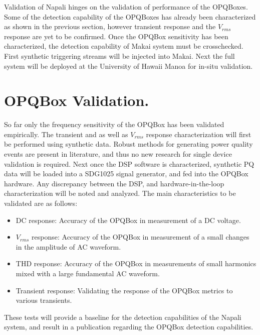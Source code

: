 Validation of Napali hinges on the validation of performance of the OPQBoxes. Some of the detection capability of the OPQBoxes has already been characterized as shown in the previous section, however transient response and the $V_{rms}$ response are yet to be confirmed. Once the OPQBox sensitivity has been characterized, the detection capability of Makai system must be crosschecked. First synthetic triggering streams will be injected into Makai. Next the full system will be deployed at the University of Hawaii Manoa for in-situ validation.

\section{OPQBox Validation.}
So far only the frequency sensitivity of the OPQBox has been validated empirically. The transient and as well as $V_{rms}$ response characterization will first be performed using synthetic data. Robust methods for generating power quality events are present in literature, and thus no new research for single device validation is required.\cite{kumar2015power}\cite{tan2013simulation} Next once the DSP software is characterized, synthetic PQ data will be loaded into a SDG1025 signal generator, and fed into the OPQBox hardware. Any discrepancy between the DSP, and hardware-in-the-loop characterization will be noted and analyzed. The main characteristics to be validated are as follows:
\begin{itemize}
  \item{DC response:} Accuracy of the OPQBox in measurement of a DC voltage.
  \item{$V_{rms}$ response:} Accuracy of the OPQBox in measurement of a small changes in the amplitude of AC waveform.
  \item{THD response:} Accuracy of the OPQBox in measurements of small harmonics mixed with a large fundamental AC waveform.
  \item{Transient response:} Validating the response of the OPQBox metrics to various transients.
\end{itemize} 
These tests will provide a baseline for the detection capabilities of the Napali system, and result in a publication regarding the OPQBox detection capabilities.

